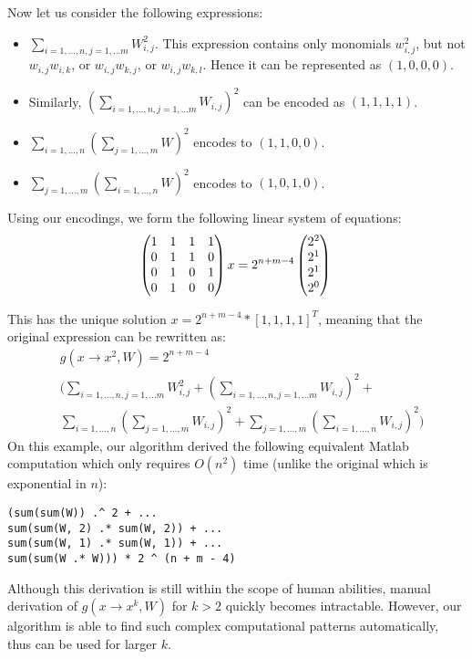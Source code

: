 Now let us consider the following expressions: 
\begin{itemize}
 \item $\sum_{i = 1, \dots, n, j = 1, \dots m} W_{i, j}^2$. 
This expression contains only monomials $w_{i, j}^2$, but not $w_{i,
  j} w_{i, k}$, or $w_{i, j} w_{k, j}$, or $w_{i, j} w_{k, l}$. Hence it can be represented as $(1, 0, 0, 0)$.
 \item Similarly, $(\sum_{i = 1, \dots, n, j = 1, \dots m} W_{i,
     j})^2$ can be encoded as $(1, 1, 1, 1)$.
 \item $\sum_{i = 1, \dots, n}(\sum_{j = 1, \dots, m} W)^2$ encodes to
   $(1, 1, 0, 0)$. 
 \item $\sum_{j = 1, \dots, m}(\sum_{i = 1, \dots, n} W)^2$ encodes to
   $(1, 0, 1, 0)$.
\end{itemize}
 
Using our encodings, we form the following linear system of equations:
 \begin{equation}
 \begin{pmatrix} 
  1 & 1 & 1 & 1 \\ 
  0 & 1 & 1 & 0 \\ 
  0 & 1 & 0 & 1 \\ 
  0 & 1 & 0 & 0 \\     
\end{pmatrix}x = 2^{n + m - 4}\begin{pmatrix} 
  2^{2}\\ 
  2^{1}\\ 
  2^{1}\\ 
  2^{0}\\     
\end{pmatrix} \\
 \end{equation}

 This has the unique solution $x=2^{n + m - 4} * [1, 1, 1, 1]^T$, meaning that the original expression can be
rewritten as: 
\begin{align*}
	&g(x \rightarrow x^2, W) = 2^{n + m - 4} \\ 
 &\Big(\sum_{i = 1, \dots, n, j = 1, \dots m} W_{i, j}^2 + (\sum_{i = 1, \dots, n, j = 1, \dots m} W_{i, j})^2 + \\
 &\sum_{i = 1, \dots, n}(\sum_{j = 1, \dots, m} W_{i, j})^2 + \sum_{j = 1, \dots, m}(\sum_{i = 1, \dots, n} W_{i, j})^2 \Big)
\end{align*}
On this example, our algorithm derived the following equivalent Matlab
computation which only requires $O(n^2)$ time (unlike the original
which is exponential in $n$):
\begin{lstlisting}
(sum(sum(W)) .^ 2 + ...
sum(sum(W, 2) .* sum(W, 2)) + ... 
sum(sum(W, 1) .* sum(W, 1)) + ... 
sum(sum(W .* W))) * 2 ^ (n + m - 4)
\end{lstlisting}
Although this derivation is still within the scope of human abilities, manual derivation
of $g(x \rightarrow x^k, W)$ for $k > 2$ quickly becomes
intractable. However, our algorithm is able to find such complex
computational patterns automatically, thus can be used for larger $k$. 

